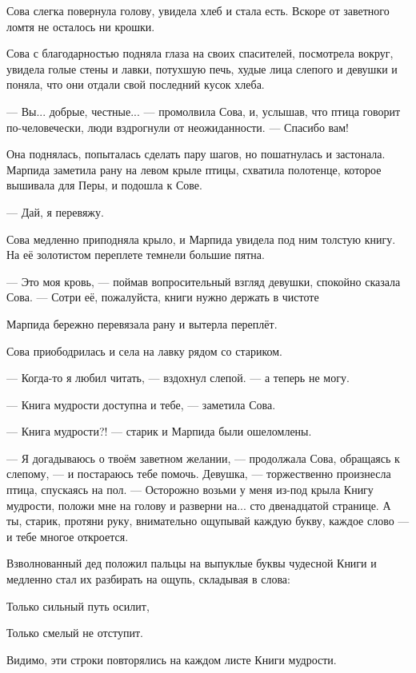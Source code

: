 \documentclass[oneside,final,14pt]{extreport}
\begin{document}
	Сова слегка повернула голову, увидела хлеб и стала есть. Вскоре от заветного ломтя не осталось ни крошки.
	
	Сова с благодарностью подняла глаза на своих спасителей, посмотрела вокруг, увидела голые стены и лавки, потухшую печь, худые лица слепого и девушки и поняла, что они отдали свой последний кусок хлеба.
	
	— Вы... добрые, честные... — промолвила Сова, и, услышав, что птица говорит по-человечески, люди вздрогнули от неожиданности. — Спасибо вам!
	
	Она поднялась, попыталась сделать пару шагов, но пошатнулась и застонала. Марпида заметила рану на левом крыле птицы, схватила полотенце, которое вышивала для Перы, и подошла к Сове.
	
	— Дай, я перевяжу.
	
	Сова медленно приподняла крыло, и Марпида увидела под ним толстую книгу. На её золотистом переплете темнели большие пятна.
	
	— Это моя кровь, — поймав вопросительный взгляд девушки, спокойно сказала Сова. — Сотри её, пожалуйста, книги нужно держать в чистоте
	
	Марпида бережно перевязала рану и вытерла переплёт.
	
	Сова приободрилась и села на лавку рядом со стариком.
	
	— Когда-то я любил читать, — вздохнул слепой. — а теперь не могу.
	
	— Книга мудрости доступна и тебе, — заметила Сова.
	
	— Книга мудрости?! — старик и Марпида были ошеломлены.
	
	— Я догадываюсь о твоём заветном желании, — продолжала Сова, обращаясь к слепому, — и постараюсь тебе помочь. Девушка, — торжественно произнесла птица, спускаясь на пол. — Осторожно возьми у меня из-под крыла Книгу мудрости, положи мне на голову и разверни на... сто двенадцатой странице. А ты, старик, протяни руку, внимательно ощупывай каждую букву, каждое слово — и тебе многое откроется.
	
	Взволнованный дед положил пальцы на выпуклые буквы чудесной Книги и медленно стал их разбирать на ощупь, складывая в слова:
	
	
	
	
\qquad \qquad \qquad 	Только сильный путь осилит,
	
\qquad \qquad \qquad 	Только смелый не отступит.
	
	
	
	
	Видимо, эти строки повторялись на каждом листе Книги мудрости.
	
\end{document}
